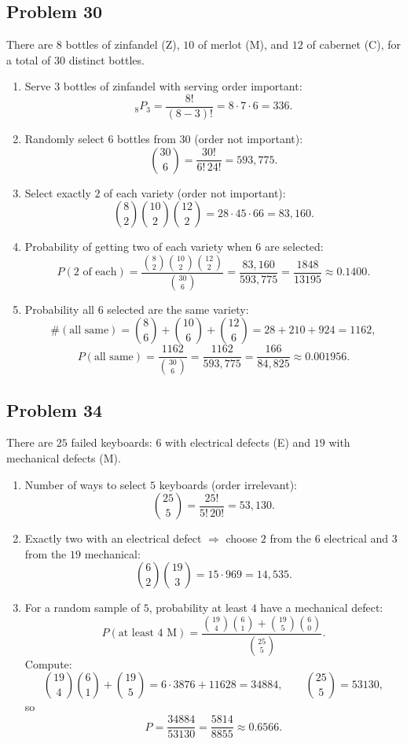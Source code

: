 \documentclass{article}
\begin{document}
\subsection*{Problem 30}

There are $8$ bottles of zinfandel (Z), $10$ of merlot (M), and $12$ of cabernet (C), for a total of $30$
distinct bottles.

\begin{enumerate}
\item[(a)] Serve $3$ bottles of zinfandel with serving order important:
\[
{}_{8}P_{3}=\frac{8!}{(8-3)!}=8\cdot 7\cdot 6=336.
\]

\item[(b)] Randomly select $6$ bottles from $30$ (order not important):
\[
\binom{30}{6}=\frac{30!}{6!\,24!}=593{,}775.
\]

\item[(c)] Select exactly $2$ of each variety (order not important):
\[
\binom{8}{2}\binom{10}{2}\binom{12}{2}
=28\cdot 45\cdot 66
=83{,}160.
\]

\item[(d)] Probability of getting two of each variety when $6$ are selected:
\[
P(\text{2 of each})=\frac{\binom{8}{2}\binom{10}{2}\binom{12}{2}}{\binom{30}{6}}
=\frac{83{,}160}{593{,}775}
=\frac{1848}{13195}
\approx 0.1400.
\]

\item[(e)] Probability all $6$ selected are the same variety:
\[
\#(\text{all same})=\binom{8}{6}+\binom{10}{6}+\binom{12}{6}
=28+210+924=1162,
\]
\[
P(\text{all same})=\frac{1162}{\binom{30}{6}}
=\frac{1162}{593{,}775}
=\frac{166}{84{,}825}
\approx 0.001956.
\]
\end{enumerate}

\subsection*{Problem 34}

There are $25$ failed keyboards: $6$ with electrical defects (E) and $19$ with mechanical defects (M).

\begin{enumerate}
\item[(a)] Number of ways to select $5$ keyboards (order irrelevant):
\[
\binom{25}{5}=\frac{25!}{5!\,20!}=53{,}130.
\]

\item[(b)] Exactly two with an electrical defect $\Rightarrow$ choose $2$ from the $6$ electrical and $3$ from
    the $19$ mechanical:
\[
\binom{6}{2}\binom{19}{3}=15\cdot 969=14{,}535.
\]

\item[(c)] For a random sample of $5$, probability at least $4$ have a mechanical defect:
\[
P(\text{at least }4\text{ M})=\frac{\binom{19}{4}\binom{6}{1}+\binom{19}{5}\binom{6}{0}}{\binom{25}{5}}.
\]
Compute:
\[
\binom{19}{4}\binom{6}{1}+\binom{19}{5}=6\cdot 3876+11628=34884,
\qquad \binom{25}{5}=53130,
\]
so
\[
P=\frac{34884}{53130}=\frac{5814}{8855}\approx 0.6566.
\]
\end{enumerate}
\end{document}
